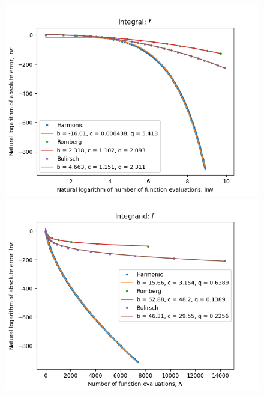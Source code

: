 \begin{figure}[H]
\centering
\begin{minipage}{0.45\textwidth}
\centering
\includegraphics[scale=0.45]{romberg_plots/cos_squared_hp_log_log_pow_fit_trend.png}
\end{minipage}
\begin{minipage}{0.45\textwidth}
\centering
\includegraphics[scale=0.45]{romberg_plots/cos_squared_hp_trend.png}
\end{minipage}
\end{figure}

